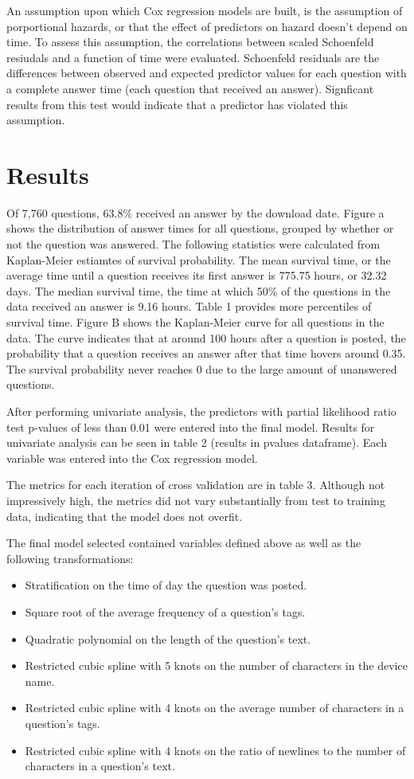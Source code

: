 \documentclass[12pt]{article}
\begin{document}
An assumption upon which Cox regression models are built, is the assumption of porportional hazards, or that the effect of predictors on hazard doesn't depend on time. To assess this assumption, the correlations between scaled Schoenfeld resiudals and a function of time were evaluated. Schoenfeld residuals are the differences between observed and expected predictor values for each question with a complete answer time (each question that received an answer). Signficant results from this test would indicate that a predictor has violated this assumption. 

  
\section{Results} 

  Of 7,760 questions, 63.8\% received an answer by the download date. Figure a shows the distribution of answer times for all questions, grouped by whether or not the question was answered. The following statistics were calculated from Kaplan-Meier estiamtes of survival probability. The mean survival time, or the average time until a question receives its first answer is 775.75 hours, or 32.32 days. The median survival time, the time at which 50\% of the questions in the data received an answer is 9.16 hours. Table 1 provides more percentiles of survival time. Figure B shows the Kaplan-Meier curve for all questions in the data. The curve indicates that at around 100 hours after a question is posted, the probability that a question receives an answer after that time hovers around 0.35. The survival probability never reaches 0 due to the large amount of unanswered questions. 

After performing univariate analysis, the predictors with partial likelihood ratio test p-values of less than 0.01 were entered into the final model. Results for univariate analysis can be seen in table 2 (results in pvalues dataframe). Each variable was entered into the Cox regression model. 

The metrics for each iteration of cross validation are in table 3. Although not impressively high, the metrics did not vary substantially from test to training data, indicating that the model does not overfit.

The final model selected contained variables defined above as well as the following transformations: 
\begin{itemize}
  \item Stratification on the time of day the question was posted. 
  \item Square root of the average frequency of a question's tags. 
  \item Quadratic polynomial on the length of the question's text. 
  \item Restricted cubic spline with 5 knots on the number of characters in the device name.
  \item Restricted cubic spline with 4 knots on the average number of characters in a question's tags.
  \item Restricted cubic spline with 4 knots on the ratio of newlines to the number of characters in a question's text. 
\end{itemize}
\end{document}
